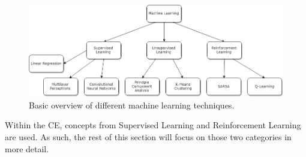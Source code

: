 	\begin{figure}[ht]
		\centering
		\includegraphics[scale=0.5]{figures/MLdiagram.png}
		\caption{Basic overview of different machine learning techniques.}		
	\end{figure}
	
	\par Within the CE, concepts from Supervised Learning and Reinforcement Learning are used. As such, the rest of this section will focus on those two categories in more detail.%
